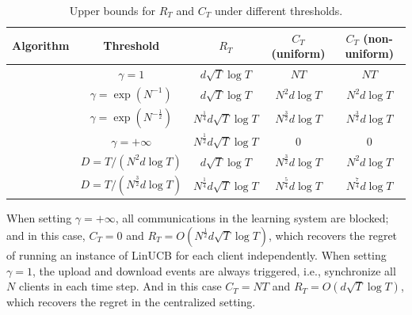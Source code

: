 \begin{table}[h]
\centering
\caption{Upper bounds for $R_{T}$ and $C_{T}$ under different thresholds.}
\begin{tabular}{ c c c c c}
\toprule
 Algorithm & Threshold & $R_{T}$ & $C_{T}$ (uniform) & $C_{T}$ (non-uniform) \\
 \hline
 \multirow{4}{*}{\modelone{}} 
 & $\gamma=1$ & $d \sqrt{T} \log{T}$ & $N T$ & $N T$ \\  
 & $\gamma=\exp(N^{-1})$ & $ d \sqrt{T} \log{T}$ & $N^{2} d \log{T}$ & $N^{2} d \log{T}$ \\
 & $\gamma=\exp(N^{-\frac{1}{2}})$ & $ N^{\frac{1}{4}} d \sqrt{T} \log{T}$ & $N^{\frac{3}{2}} d \log{T}$  & $N^{\frac{3}{2}} d \log{T}$ \\
 & $\gamma=+\infty$ & $ N^{\frac{1}{2}} d \sqrt{T} \log{T}$ & $0$ & $0$ \\
 \hline
 \multirow{2}{*}{\modelbaseline{}} & $D={T}/{(N^{2} d \log{T})}$ & $d \sqrt{T} \log{T}$ & $N^{\frac{3}{2}} d \log{T}$ & $N^{2} d \log{T}$ \\
  & $D={T}/{(N^{\frac{3}{2}} d \log{T})}$ & $N^{\frac{1}{4}} d \sqrt{T} \log{T}$ & $N^{\frac{5}{4}} d \log{T}$ & $N^{\frac{7}{4}} d \log{T}$\\ 
\bottomrule
\end{tabular}
\label{tb:theoretical_comparison}
\end{table}

When setting $\gamma=+\infty$, all communications in the learning system are blocked; and in this case, $C_{T}=0$ and $R_{T}=O(N^{\frac{1}{2}}d\sqrt{T}\log{T})$, which recovers the regret of running an instance of LinUCB for each client independently. When setting $\gamma=1$, the upload and download events are always triggered, i.e., synchronize all $N$ clients in each time step. And in this case $C_{T}=NT$ and $R_{T}=O(d\sqrt{T}\log{T})$, which recovers the regret in the centralized setting. 

